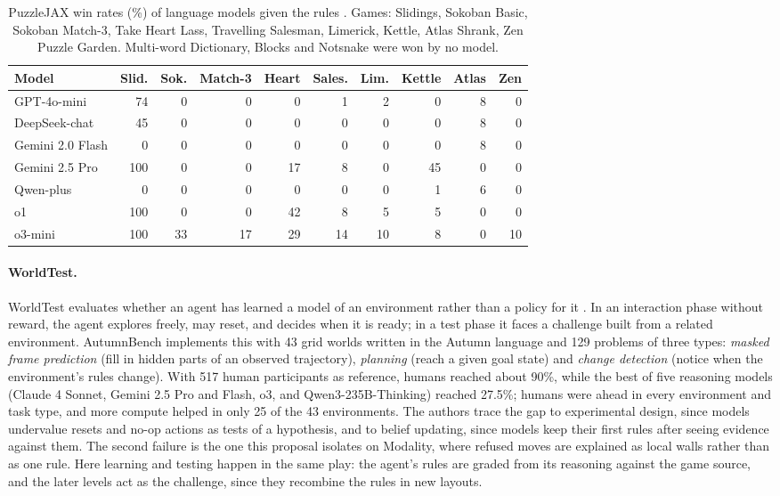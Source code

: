 \documentclass[11pt,a4paper]{article}
\begin{document}
\begin{table}[ht]
  \centering\small
  \setlength{\tabcolsep}{4.5pt}
  \begin{tabular}{l*{9}{r}}
    \toprule
    Model & Slid. & Sok. & Match-3 & Heart & Sales. & Lim. & Kettle &
      Atlas & Zen \\
    \midrule
    GPT-4o-mini      &  74 &  0 &  0 &  0 &  1 &  2 &  0 & 8 &  0 \\
    DeepSeek-chat    &  45 &  0 &  0 &  0 &  0 &  0 &  0 & 8 &  0 \\
    Gemini 2.0 Flash &   0 &  0 &  0 &  0 &  0 &  0 &  0 & 8 &  0 \\
    Gemini 2.5 Pro   & 100 &  0 &  0 & 17 &  8 &  0 & 45 & 0 &  0 \\
    Qwen-plus        &   0 &  0 &  0 &  0 &  0 &  0 &  1 & 6 &  0 \\
    o1               & 100 &  0 &  0 & 42 &  8 &  5 &  5 & 0 &  0 \\
    o3-mini          & 100 & 33 & 17 & 29 & 14 & 10 &  8 & 0 & 10 \\
    \bottomrule
  \end{tabular}
  \caption{PuzzleJAX win rates (\%) of language models given the rules
  \citep[Fig.~7c]{earle2025puzzlejax}. Games: Slidings, Sokoban Basic,
  Sokoban Match-3, Take Heart Lass, Travelling Salesman, Limerick, Kettle,
  Atlas Shrank, Zen Puzzle Garden. Multi-word Dictionary, Blocks and Notsnake
  were won by no model.}
  \label{tab:pjax}
\end{table}

\paragraph{WorldTest.}
WorldTest evaluates whether an agent has learned a model of an environment
rather than a policy for it \citep{warrier2026worldtest}. In an interaction
phase without reward, the agent explores freely, may reset, and decides when
it is ready; in a test phase it faces a challenge built from a related
environment. AutumnBench implements this with 43 grid worlds written in the
Autumn language and 129 problems of three types: \emph{masked frame
prediction} (fill in hidden parts of an observed trajectory), \emph{planning}
(reach a given goal state) and \emph{change detection} (notice when the
environment's rules change). With 517 human participants as reference, humans
reached about 90\%, while the best of five reasoning models (Claude 4 Sonnet,
Gemini 2.5 Pro and Flash, o3, and Qwen3-235B-Thinking) reached 27.5\%; humans
were ahead in every environment and task type, and more compute helped in only
25 of the 43 environments. The authors trace the gap to experimental design,
since models undervalue resets and no-op actions as tests of a hypothesis,
and to belief updating, since models keep their first rules after seeing
evidence against them. The second failure is the one this proposal isolates
on Modality, where refused moves are explained as local walls rather than as
one rule. Here learning and testing happen in the same play: the agent's
rules are graded from its reasoning against the game source, and the later
levels act as the challenge, since they recombine the rules in new layouts.
\end{document}

